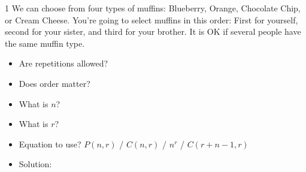 \documentclass[a4paper,12pt]{book}
\newcounter{question}
\begin{document}
        \begin{question}{\thequestion}{1}
            We can choose from four types of muffins:
            Blueberry, Orange, Chocolate Chip, or Cream Cheese.
            You're going to select muffins in this order:
            First for yourself, second for your sister,
            and third for your brother.
            It is OK if several people have the same muffin type.
            
            \begin{itemize}
                \item[]     Are repetitions allowed?    
                \item[]     Does order matter?          
                \item[]     What is $n$?                
                \item[]     What is $r$?                
                \item[]     Equation to use? $P(n,r)$ / $C(n,r)$ / $n^{r}$ / $C(r+n-1,r)$            
                \item[]     Solution: 
            \end{itemize}
        \end{question}
        
        \hrulefill
        
\end{document}
